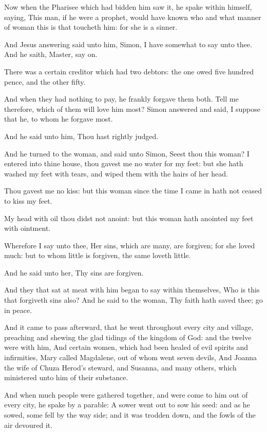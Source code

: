 \Verse Now when the Pharisee which had bidden him saw it, he spake within himself, saying, This man, if he were a prophet, would have known who and what manner of woman this is that toucheth him: for she is a sinner.

\Verse And Jesus answering said unto him, Simon, I have somewhat to say unto thee. And he saith, Master, say on.

\Verse There was a certain creditor which had two debtors: the one owed five hundred pence, and the other fifty.

\Verse And when they had nothing to pay, he frankly forgave them both.  Tell me therefore, which of them will love him most?  \Verse Simon answered and said, I suppose that he, to whom he forgave most.

And he said unto him, Thou hast rightly judged.

\Verse And he turned to the woman, and said unto Simon, Seest thou this woman? I entered into thine house, thou gavest me no water for my feet: but she hath washed my feet with tears, and wiped them with the hairs of her head.

\Verse Thou gavest me no kiss: but this woman since the time I came in hath not ceased to kiss my feet.

\Verse My head with oil thou didst not anoint: but this woman hath anointed my feet with ointment.

\Verse Wherefore I say unto thee, Her sins, which are many, are forgiven; for she loved much: but to whom little is forgiven, the same loveth little.

\Verse And he said unto her, Thy sins are forgiven.

\Verse And they that sat at meat with him began to say within themselves, Who is this that forgiveth sins also?  \Verse And he said to the woman, Thy faith hath saved thee; go in peace.


\Chapter
\Verse And it came to pass afterward, that he went throughout every city and village, preaching and shewing the glad tidings of the kingdom of God: and the twelve were with him, \Verse And certain women, which had been healed of evil spirits and infirmities, Mary called Magdalene, out of whom went seven devils, \Verse And Joanna the wife of Chuza Herod's steward, and Susanna, and many others, which ministered unto him of their substance.

\Verse And when much people were gathered together, and were come to him out of every city, he spake by a parable: \Verse A sower went out to sow his seed: and as he sowed, some fell by the way side; and it was trodden down, and the fowls of the air devoured it.

